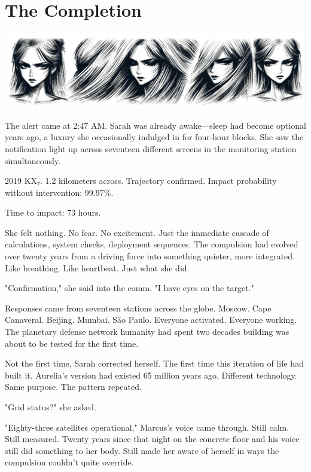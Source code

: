 \chapter{The Completion}
\label{ch:30}



\begin{center}
\includegraphics[width=\textwidth]{images/chapterImages/genesis_sketch_00131_.png}
\end{center}

The alert came at 2:47 AM. Sarah was already awake—sleep had become optional years ago, a luxury she occasionally indulged in for four-hour blocks. She saw the notification light up across seventeen different screens in the monitoring station simultaneously.

2019 KX₇. 1.2 kilometers across. Trajectory confirmed. Impact probability without intervention: 99.97\%.

Time to impact: 73 hours.

She felt nothing. No fear. No excitement. Just the immediate cascade of calculations, system checks, deployment sequences. The compulsion had evolved over twenty years from a driving force into something quieter, more integrated. Like breathing. Like heartbeat. Just what she did.

"Confirmation," she said into the comm. "I have eyes on the target."

Responses came from seventeen stations across the globe. Moscow. Cape Canaveral. Beijing. Mumbai. São Paulo. Everyone activated. Everyone working. The planetary defense network humanity had spent two decades building was about to be tested for the first time.

Not the first time, Sarah corrected herself. The first time this iteration of life had built it. Aurelia's version had existed 65 million years ago. Different technology. Same purpose. The pattern repeated.

"Grid status?" she asked.

"Eighty-three satellites operational," Marcus's voice came through. Still calm. Still measured. Twenty years since that night on the concrete floor and his voice still did something to her body. Still made her aware of herself in ways the compulsion couldn't quite override.

